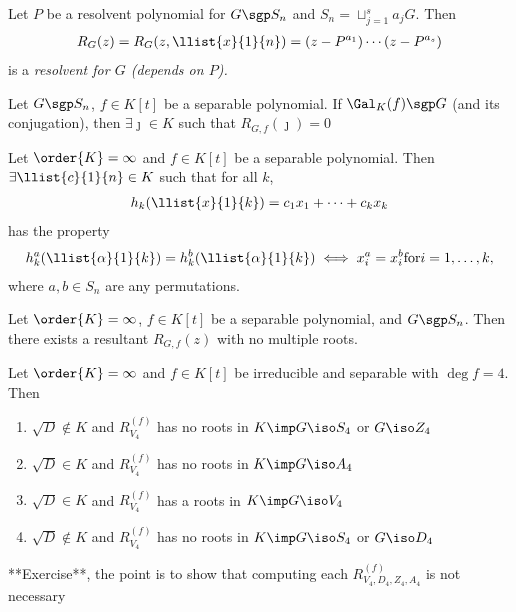 \documentclass{article}
\begin{document}
\begin{tdefinition}[Resolvent]
  Let \( P \) be a resolvent polynomial for \( G\sgp S_n \) and \( S_n = \sqcup_{j=1}^{s} a_j G \).
  Then \begin{align*}
    R_G(z) = R_G(z,\llist{x}{1}{n}) = (z-P^{a_1})\cdots(z-P^{a_s})
  \end{align*}
  is a \it{resolvent} for \( G \) (depends on \( P \)).
\end{tdefinition}

\begin{tlemma}
  Let \( G\sgp S_n \), \( f\in K[t] \) be a separable polynomial.
  If \( \Gal_K(f) \sgp G \) (and its conjugation), then \( \exists \jmath\in K \) such that \( R_{G,f}(\jmath) = 0 \)
\end{tlemma}

\begin{tlemma}
  Let \( \order{K}=\infty \) and \( f\in K[t] \) be a separable polynomial.
  Then \( \exists \llist{c}{1}{n}\in K \) such that for all \( k \), \begin{align*}
    h_k(\llist{x}{1}{k}) = c_1x_1+\cdots+c_kx_k
  \end{align*}
  has the property \begin{align*}
    h_k^a(\llist{\alpha}{1}{k}) = h_k^b(\llist{\alpha}{1}{k}) \iff x_i^{a} = x_i^{b} \mathrm{ for } i = 1,\ldots,k,
  \end{align*}
  where \( a,b\in S_n \) are any permutations.
\end{tlemma}

\begin{ttheorem}
  Let \( \order{K}=\infty \), \( f\in K[t] \) be a separable polynomial, and \( G\sgp S_n \).
  Then there exists a resultant \( R_{G,f} (z) \) with no multiple roots.
\end{ttheorem}

\begin{ttheorem}
  Let \( \order{K} = \infty \) and \( f\in K[t] \) be irreducible and separable with \( \deg f = 4 \).
  Then \begin{enumerate}
    \item \( \sqrt D \not\in K\) and \( R_{V_4}^{(f)} \) has no roots in \( K \imp G\iso S_4 \) or \( G\iso Z_4 \)
    \item \( \sqrt D \in K\) and \( R_{V_4}^{(f)} \) has no roots in \( K \imp G\iso A_4 \)
    \item \( \sqrt D \in K\) and \( R_{V_4}^{(f)} \) has a roots in \( K \imp G\iso V_4 \)
    \item \( \sqrt D \not\in K\) and \( R_{V_4}^{(f)} \) has no roots in \( K \imp G\iso S_4 \) or \( G\iso D_4 \)
  \end{enumerate}
  **Exercise**, the point is to show that computing each \( R^{(f)}_{V_4,D_4,Z_4,A_4} \) is not necessary
\end{ttheorem}
\end{document}
